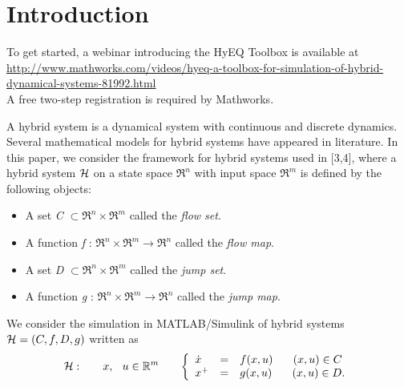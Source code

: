 \documentclass{article}
\begin{document}
\tableofcontents

\section{Introduction}
\begin{center}
\begin{framed}To get started, a webinar introducing the HyEQ Toolbox is available at\\
{\footnotesize\url{http://www.mathworks.com/videos/hyeq-a-toolbox-for-simulation-of-hybrid-dynamical-systems-81992.html}}\\
A free two-step registration is required by Mathworks.
\end{framed}
\end{center}

A hybrid system is a dynamical system with continuous and discrete dynamics. Several mathematical models for hybrid systems have appeared in literature. In this paper, we consider the framework for hybrid systems used in [3,4], where a hybrid system $\mathcal{H}$ on a state space $\Re^n$ with input space $\Re^m$ is defined by the following objects:
\begin{itemize}
\item A set {\it C} $\subset \Re^n \times \Re^m$ called the {\it flow set}.
\item A function {\it f} : $\Re^n \times \Re^m \to \Re^n$ called the {\it flow map}.
\item A set {\it D} $\subset \Re^n \times \Re^m$ called the {\it jump set}.
\item A function {\it g} : $\Re^n \times \Re^m \to \Re^n$ called the {\it jump map}.
\end{itemize}

\bigskip
\noindent
We consider the simulation in MATLAB/Simulink of hybrid systems $\mathcal{H} = (C,f,D,g)$ written as
\begin{eqnarray}\label{eqn:HS}
\HS: \hspace{0.25in} x, \hspace{.1in} u \in \Re^{m}  \hspace{0.25in}\left\{
 \begin{array}{lll}
\dot{x} &=&f(x,u)\hspace{0.25in} (x,u) \in C \\
x^{+}&=&g(x,u)\hspace{0.25in} (x,u) \in D.
\end{array}
\right.
\end{eqnarray}
\end{document}
